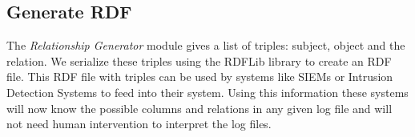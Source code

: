 \subsection{Generate RDF}
\label{Generate RDF}

The \textit{Relationship Generator} module gives a list of triples: subject, object and the relation. We serialize these triples using the RDFLib library to create an RDF file. This RDF file with triples can be used by systems like SIEMs or Intrusion Detection Systems to feed into their system. Using this information these systems will now know the possible columns and relations in any given log file and will not need human intervention to interpret the log files.
